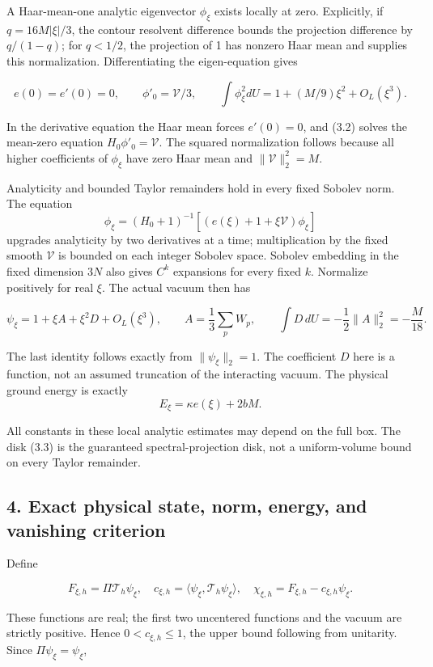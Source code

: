 \documentclass[
  11pt,
]{article}
\begin{document}
A Haar-mean-one analytic eigenvector \(\phi_\xi\) exists locally at
zero. Explicitly, if \(q=16M|\xi|/3\), the contour resolvent difference
bounds the projection difference by \(q/(1-q)\); for \(q<1/2\), the
projection of 1 has nonzero Haar mean and supplies this normalization.
Differentiating the eigen-equation gives

\[
e(0)=e'(0)=0,\qquad \phi'_0=\mathcal V/3,\qquad
\int\phi_\xi^2dU=1+(M/9)\xi^2+O_L(\xi^3).
\tag{3.4}
\]

In the derivative equation the Haar mean forces \(e'(0)=0\), and (3.2)
solves the mean-zero equation \(H_0\phi'_0=\mathcal V\). The squared
normalization follows because all higher coefficients of \(\phi_\xi\)
have zero Haar mean and \(\|\mathcal V\|_2^2=M\).

Analyticity and bounded Taylor remainders hold in every fixed Sobolev
norm. The equation \[
\phi_\xi=(H_0+1)^{-1}[(e(\xi)+1+\xi\mathcal V)\phi_\xi]
\] upgrades analyticity by two derivatives at a time; multiplication by
the fixed smooth \(\mathcal V\) is bounded on each integer Sobolev
space. Sobolev embedding in the fixed dimension \(3N\) also gives
\(C^k\) expansions for every fixed \(k\). Normalize positively for real
\(\xi\). The actual vacuum then has

\[
\psi_\xi=1+\xi A+\xi^2D+O_L(\xi^3),\qquad
A=\frac13\sum_pW_p,\qquad \int D\,dU=-\frac12\|A\|_2^2=-\frac M{18}.
\tag{3.5}
\]

The last identity follows exactly from \(\|\psi_\xi\|_2=1\). The
coefficient \(D\) here is a function, not an assumed truncation of the
interacting vacuum. The physical ground energy is exactly \[
E_\xi=\kappa e(\xi)+2bM.
\tag{3.6}
\]

All constants in these local analytic estimates may depend on the full
box. The disk (3.3) is the guaranteed spectral-projection disk, not a
uniform-volume bound on every Taylor remainder.

\subsection{4. Exact physical state, norm, energy, and vanishing
criterion}\label{magnetic-part-2-exact-physical-state-norm-energy-and-vanishing-criterion}

Define

\[
F_{\xi,h}=\Pi\mathcal T_h\psi_\xi,\quad
c_{\xi,h}=\langle\psi_\xi,\mathcal T_h\psi_\xi\rangle,\quad
\chi_{\xi,h}=F_{\xi,h}-c_{\xi,h}\psi_\xi.
\tag{4.1}
\]

These functions are real; the first two uncentered functions and the
vacuum are strictly positive. Hence \(0<c_{\xi,h}\le1\), the upper bound
following from unitarity. Since \(\Pi\psi_\xi=\psi_\xi\),
\end{document}
